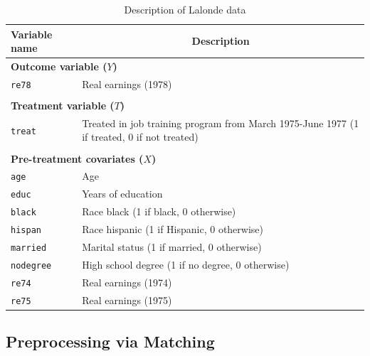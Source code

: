 \documentclass[oneside,letterpaper,titlepage]{article}
\begin{document}
\begin{table}[h]
\centering
\begin{tabular}{lp{3in}}
  \hline 
  \multicolumn{1}{l}{Variable name} & \multicolumn{1}{c}{Description} \\
  \hline
  \multicolumn{2}{l}{\textbf{Outcome variable ($Y$)}} \\ 
  \texttt{re78} & Real earnings (1978) \\ \\
  \multicolumn{2}{l}{\textbf{Treatment variable ($T$)}} \\
  \texttt{treat} & Treated in job training program from March 1975-June
  1977 (1 if treated, 0 if not treated)
  \\ \\
  \multicolumn{2}{l}{\textbf{Pre-treatment covariates ($X$)}} \\
  \texttt{age} & Age\\
  \texttt{educ} & Years of education \\
  \texttt{black} & Race black (1 if black, 0 otherwise) \\
  \texttt{hispan} & Race hispanic  (1 if Hispanic, 0 otherwise) \\
  \texttt{married} & Marital status (1 if married, 0 otherwise) \\
  \texttt{nodegree} & High school degree (1 if no degree, 0 otherwise)\\
  \texttt{re74} & Real earnings (1974) \\
  \texttt{re75} & Real earnings (1975) \\ 
  \hline
\end{tabular}\label{lalonde}
\caption{Description of Lalonde data \label{dwvars}}
\end{table}



\subsection{Preprocessing via Matching}
\label{subsec:matching}
\end{document}
